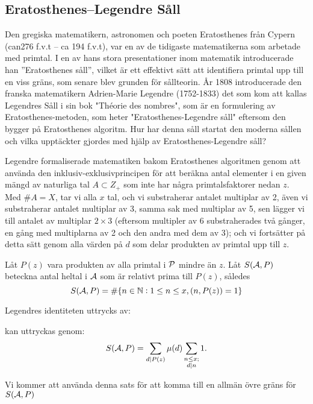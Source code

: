 

\subsection{Eratosthenes–Legendre Såll}
\hspace{0.3cm} Den gregiska matematikern, astronomen och poeten Eratosthenes från Cypern (can276 f.v.t – ca 194 f.v.t), var en av de tidigaste matematikerna som arbetade med primtal. I en av hans stora presentationer inom matematik introducerade han ”Eratosthenes såll”, vilket är ett effektivt sätt att identifiera primtal upp till en viss gräns, som senare blev grunden för sållteorin.
År 1808 introducerade den franska matematikern Adrien-Marie Legendre (1752-1833) det som kom att kallas Legendres Såll i sin bok "Théorie des nombres", som är en formulering av Eratosthenes-metoden, som heter "Eratosthenes-Legendre såll" eftersom den bygger på Eratosthenes algoritm. Hur har denna såll startat den moderna sållen och vilka upptäckter gjordes med hjälp av Eratosthenes-Legendre såll?

 Legendre formaliserade matematiken bakom Eratosthenes algoritmen genom att använda den inklusiv-exklusivprincipen för att beräkna antal elementer i en given mängd av naturliga tal  $ A\subset Z_{+} $ som inte har några primtalsfaktorer nedan $ z $. Med $  \#A=X $, tar vi alla $ x $ tal, och vi substraherar antalet multiplar av 2, även vi substraherar antalet multiplar av 3, samma sak med multiplar av 5, sen lägger vi till antalet av multiplar $ 2\times3 $ (eftersom multipler av 6 substraherades två gånger, en gång med multiplarna av 2 och den andra med dem av 3); och vi fortsätter på detta sätt genom alla värden på  $ d $ som delar produkten av primtal upp till  $ z $. 
 
Låt $ P(z) $ vara produkten av alla primtal i $ \P $ mindre än $ z $. Låt $ S(\A, P) $ beteckna antal heltal i $ \A $ som är relativt prima till $ P(z) $, således
\[S(\A, P)=\card{\lbrace n\in \mathbb{N}:1\leq n\leq x, \gcd{n,P(z)}=1 \rbrace}\]

Legendres identiteten uttrycks av: 
\begin{theorem} kan uttryckas genom:
\[S(\A, P)=\sum_{d\divides P(z)}\mu(d)\sum_{\substack{n\leq x;\\d\divides n}}1. \]
\end{theorem}
Vi kommer att använda denna sats för att komma till en allmän övre gräns för $ S(\A, P) $


